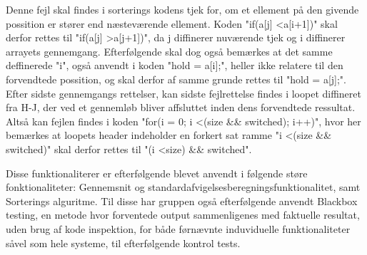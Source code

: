 \documentclass[11pt]{article}
\begin{document}
    Denne fejl skal findes i sorterings kodens tjek for, om et ellement på den givende possition er stører end næsteværende ellement. Koden "if(a[j] \textless a[i+1])" skal derfor rettes til "if(a[j] \textgreater a[j+1])", da j diffinerer nuværende tjek og i diffinerer arrayets gennemgang. Efterfølgende skal dog også bemærkes at det samme deffinerede "i", også anvendt i koden "hold = a[i];", heller ikke relatere til den forvendtede possition, og skal derfor af samme grunde rettes til "hold = a[j];".\\
    Efter sidste gennemgangs rettelser, kan sidste fejlrettelse findes i loopet diffineret fra H-J, der ved et gennemløb bliver affsluttet inden dens forvendtede ressultat. Altså kan fejlen findes i koden "for(i = 0; i \textless (size \&\& switched); i++)", hvor her bemærkes at loopets header indeholder en forkert sat ramme "i \textless (size \&\& switched)" skal derfor rettes til "(i \textless size) \&\& switched".

    \noindent
    Disse funktionaliterer er efterfølgende blevet anvendt i følgende støre fonktionaliteter:
    Gennemsnit og standardafvigelsesberegningsfunktionalitet,
    samt Sorterings alguritme.
    Til disse har gruppen også efterfølgende anvendt Blackbox testing, en metode hvor forventede output sammenligenes med faktuelle resultat, uden brug af kode inspektion, for både førnævnte induviduelle funktionaliteter såvel som hele systeme, til efterfølgende kontrol tests.
    
\end{document}
